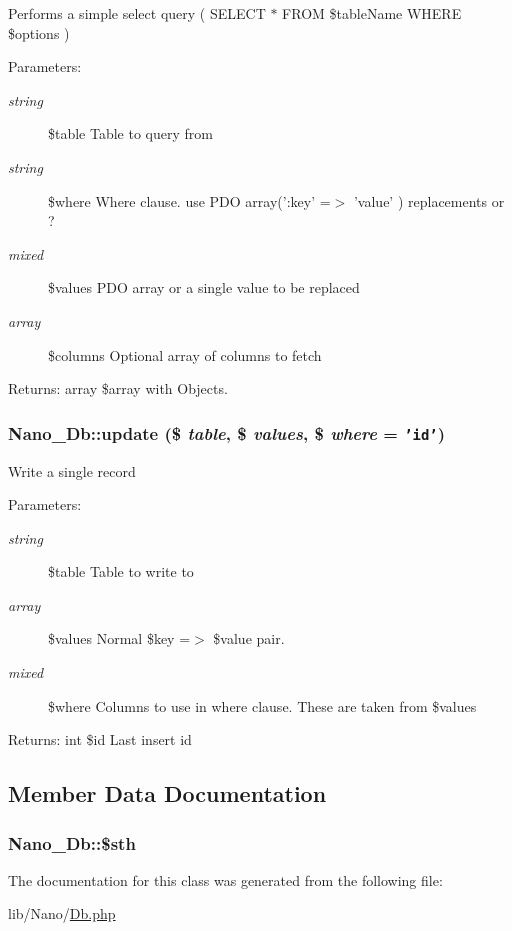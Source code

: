 Performs a simple select query ( SELECT $\ast$ FROM \$tableName WHERE \$options )

\begin{Desc}
\item[Parameters:]
\begin{description}
\item[{\em string}]\$table Table to query from \item[{\em string}]\$where Where clause. use PDO array(':key' =$>$ 'value' ) replacements or ? \item[{\em mixed}]\$values PDO array or a single value to be replaced \item[{\em array}]\$columns Optional array of columns to fetch\end{description}
\end{Desc}
\begin{Desc}
\item[Returns:]array \$array with Objects. \end{Desc}
\hypertarget{classNano__Db_2bf5ecd008e9beb3536e6770a5707757}{
\subsubsection[{update}]{\setlength{\rightskip}{0pt plus 5cm}Nano\_\-Db::update (\$ {\em table}, \/  \$ {\em values}, \/  \$ {\em where} = {\tt 'id'})}}
\label{classNano__Db_2bf5ecd008e9beb3536e6770a5707757}


Write a single record

\begin{Desc}
\item[Parameters:]
\begin{description}
\item[{\em string}]\$table Table to write to \item[{\em array}]\$values Normal \$key =$>$ \$value pair. \item[{\em mixed}]\$where Columns to use in where clause. These are taken from \$values\end{description}
\end{Desc}
\begin{Desc}
\item[Returns:]int \$id Last insert id \end{Desc}


\subsection{Member Data Documentation}
\hypertarget{classNano__Db_c4a2f87c3b66ceeb05b43b710b8c06f0}{
\subsubsection[{\$sth}]{\setlength{\rightskip}{0pt plus 5cm}Nano\_\-Db::\$sth}}
\label{classNano__Db_c4a2f87c3b66ceeb05b43b710b8c06f0}




The documentation for this class was generated from the following file:\begin{CompactItemize}
\item 
lib/Nano/\hyperlink{Db_8php}{Db.php}\end{CompactItemize}

